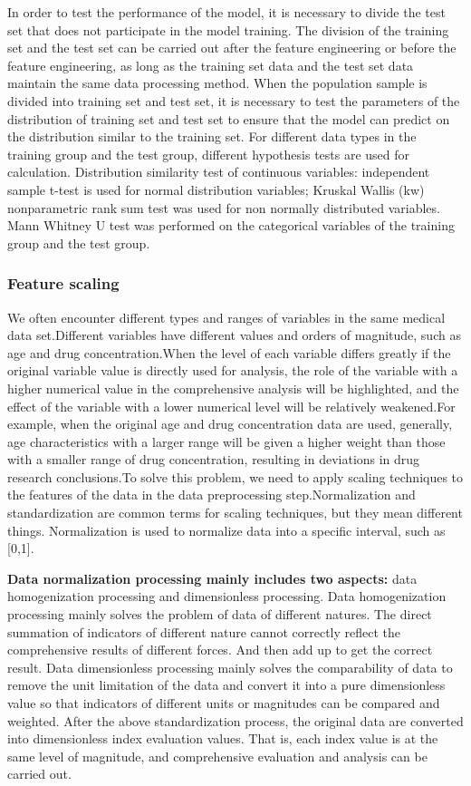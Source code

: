 In order to test the performance of the model, it is necessary to divide the test set that does not participate in the model training. The division of the training set and the test set can be carried out after the feature engineering or before the feature engineering, as long as the training set data and the test set data maintain the same data processing method. When the population sample is divided into training set and test set, it is necessary to test the parameters of the distribution of training set and test set to ensure that the model can predict on the distribution similar to the training set. For different data types in the training group and the test group, different hypothesis tests are used for calculation. Distribution similarity test of continuous variables: independent sample t-test is used for normal distribution variables; Kruskal Wallis (kw) nonparametric rank sum test was used for non normally distributed variables. Mann Whitney U test was performed on the categorical variables of the training group and the test group.

\subsubsection{Feature scaling}
We often encounter different types and ranges of variables in the same medical data set.Different variables have different values and orders of magnitude, such as age and drug concentration.When the level of each variable differs greatly if the original variable value is directly used for analysis, the role of the variable with a higher numerical value in the comprehensive analysis will be highlighted, and the effect of the variable with a lower numerical level will be relatively weakened.For example, when the original age and drug concentration data are used, generally, age characteristics with a larger range will be given a higher weight than those with a smaller range of drug concentration, resulting in deviations in drug research conclusions.To solve this problem, we need to apply scaling techniques to the features of the data in the data preprocessing step.Normalization and standardization are common terms for scaling techniques, but they mean different things.
Normalization is used to normalize data into a specific interval, such as [0,1]. 

\textbf{Data normalization processing mainly includes two aspects:} data homogenization processing and dimensionless processing. Data homogenization processing mainly solves the problem of data of different natures. The direct summation of indicators of different nature cannot correctly reflect the comprehensive results of different forces. And then add up to get the correct result. Data dimensionless processing mainly solves the comparability of data to remove the unit limitation of the data and convert it into a pure dimensionless value so that indicators of different units or magnitudes can be compared and weighted. After the above standardization process, the original data are converted into dimensionless index evaluation values. That is, each index value is at the same level of magnitude, and comprehensive evaluation and analysis can be carried out.


